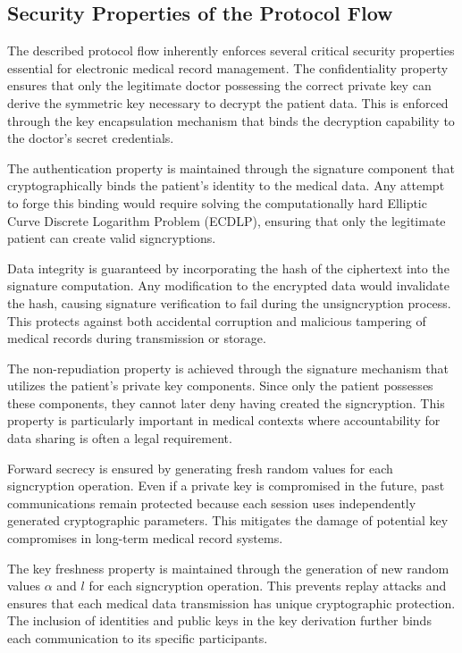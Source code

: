 \documentclass[10pt]{article}
\begin{document}
\subsection{Security Properties of the Protocol Flow}
The described protocol flow inherently enforces several critical security properties essential for electronic medical record management. The confidentiality property ensures that only the legitimate doctor possessing the correct private key can derive the symmetric key necessary to decrypt the patient data. This is enforced through the key encapsulation mechanism that binds the decryption capability to the doctor's secret credentials.

The authentication property is maintained through the signature component that cryptographically binds the patient's identity to the medical data. Any attempt to forge this binding would require solving the computationally hard Elliptic Curve Discrete Logarithm Problem (ECDLP), ensuring that only the legitimate patient can create valid signcryptions.

Data integrity is guaranteed by incorporating the hash of the ciphertext into the signature computation. Any modification to the encrypted data would invalidate the hash, causing signature verification to fail during the unsigncryption process. This protects against both accidental corruption and malicious tampering of medical records during transmission or storage.

The non-repudiation property is achieved through the signature mechanism that utilizes the patient's private key components. Since only the patient possesses these components, they cannot later deny having created the signcryption. This property is particularly important in medical contexts where accountability for data sharing is often a legal requirement.

Forward secrecy is ensured by generating fresh random values for each signcryption operation. Even if a private key is compromised in the future, past communications remain protected because each session uses independently generated cryptographic parameters. This mitigates the damage of potential key compromises in long-term medical record systems.

The key freshness property is maintained through the generation of new random values $\alpha$ and $l$ for each signcryption operation. This prevents replay attacks and ensures that each medical data transmission has unique cryptographic protection. The inclusion of identities and public keys in the key derivation further binds each communication to its specific participants.
\end{document}

